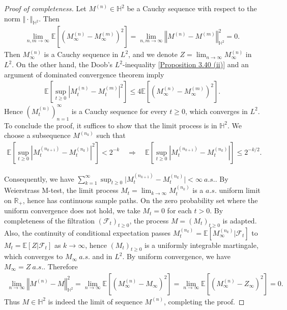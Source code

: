 \documentclass{article}
\numberwithin{equation}{section}
\newcommand{\E}{\mathbb{E}}
\theoremstyle{plain}
\theoremstyle{definition}
\begin{document}
\begin{proof}[Proof of completeness]
Let $M^{(n)}\in\mathbb{H}^2$ be a Cauchy sequence with respect to the norm $\Vert\cdot\Vert_{\mathbb{H}^2}$. Then
\begin{align*}
	\lim_{n,m\to\infty}\E\left[\left(M^{(n)}_\infty-M^{(m)}_\infty\right)^2\right] = \lim_{n,m\to\infty}\left\Vert M^{(n)}-M^{(m)}\right\Vert_{\mathbb{H}^2}^2=0.
\end{align*}
Then $M_\infty^{(n)}$ is a Cauchy sequence in $L^2$, and we denote $Z=\lim_{n\to\infty}M_\infty^{(n)}$ in $L^2$. On the other hand, the Doob's $L^2$-inequality [\hyperref[prop:3.40]{Proposition 3.40 (ii)}] and an argument of dominated convergence theorem imply
\begin{align*}
	\E\left[\sup_{t\geq 0}\left\vert M^{(n)}_t-M^{(m)}_t\right\vert^2\right]\leq 4\E\left[\left(M^{(n)}_\infty-M^{(m)}_\infty\right)^2\right].
\end{align*}
Hence $(M_t^{(n)})_{n=1}^\infty$ is a Cauchy sequence for every $t\geq 0$, which converges in $L^2$. To conclude the proof, it suffices to show that the limit process is in $\mathbb{H}^2$. We choose a subsequence $M^{(n_k)}$ such that 
\begin{align*}
	\E\left[\sup_{t\geq 0}\left\vert M^{(n_{k+1})}_t-M^{(n_k)}_t\right\vert^2\right]<2^{-k}\quad\Rightarrow\quad \E\left[\sup_{t\geq 0}\left\vert M^{(n_{k+1})}_t-M^{(n_k)}_t\right\vert\right]\leq 2^{-k/2}.
\end{align*}

Consequently, we have $\sum_{k=1}^\infty\sup_{t\geq 0}\vert M^{(n_{k+1})}_t-M^{(n_k)}_t\vert < \infty\ a.s.$. By Weierstrass M-test, the limit process $M_t=\lim_{k\to\infty} M_t^{(n_k)}$ is a $a.s.$ uniform limit on $\mathbb{R}_+$, hence has continuous sample paths. On the zero probability set where the uniform convergence does not
hold, we take $M_t=0$ for each $t>0$. By completeness of the filtration $(\mathscr{F}_t)_{t\geq 0}$, the process $M=(M_t)_{t\geq 0}$ is adapted. Also, the continuity of conditional expectation passes $M_t^{(n_k)}=\E[M_\infty^{(n_k)}|\mathscr{F}_t]$ to $M_t=\E[Z|\mathscr{F}_t]$ as $k\to\infty$, hence $(M_t)_{t\geq 0}$ is a uniformly integrable martingale, which converges to $M_\infty\ a.s.$ and in $L^2$. By uniform convergence, we have $M_\infty = Z\ a.s.$. Therefore
\begin{align*}
	\lim_{n\to\infty}\left\Vert M^{(n)}-M\right\Vert_{\mathbb{H}^2}^2 = \lim_{n\to\infty}\E\left[\left(M^{(n)}_\infty-M_\infty\right)^2\right] = \lim_{n\to\infty}\E\left[\left(M^{(n)}_\infty-Z_\infty\right)^2\right]=0.
\end{align*}
Thus $M\in\mathbb{H}^2$ is indeed the limit of sequence $M^{(n)}$, completing the proof.
\end{proof}
\end{document}
